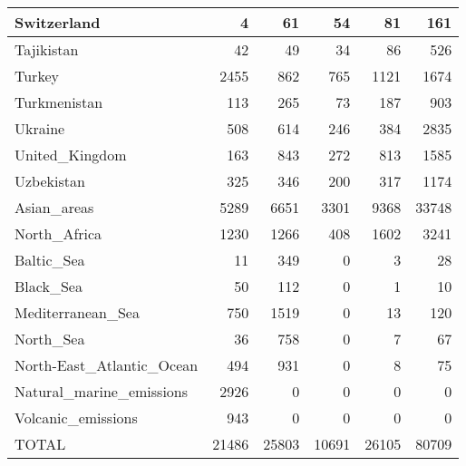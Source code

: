 \begin{table}
\begin{center}
\begin{tabular}{|l|r|r|r|r|r|}
                   Switzerland&     4&    61&    54&    81&   161 \\\hline
                    Tajikistan&    42&    49&    34&    86&   526 \\\hline
                        Turkey&  2455&   862&   765&  1121&  1674 \\\hline
                  Turkmenistan&   113&   265&    73&   187&   903 \\\hline
                       Ukraine&   508&   614&   246&   384&  2835 \\\hline
                United_Kingdom&   163&   843&   272&   813&  1585 \\\hline
                    Uzbekistan&   325&   346&   200&   317&  1174 \\\hline
                   Asian_areas&  5289&  6651&  3301&  9368& 33748 \\\hline
                  North_Africa&  1230&  1266&   408&  1602&  3241 \\\hline
                    Baltic_Sea&    11&   349&     0&     3&    28 \\\hline
                     Black_Sea&    50&   112&     0&     1&    10 \\\hline
             Mediterranean_Sea&   750&  1519&     0&    13&   120 \\\hline
                     North_Sea&    36&   758&     0&     7&    67 \\\hline
     North-East_Atlantic_Ocean&   494&   931&     0&     8&    75 \\\hline
      Natural_marine_emissions&  2926&     0&     0&     0&     0 \\\hline
            Volcanic_emissions&   943&     0&     0&     0&     0 \\\hline\hline
                         TOTAL& 21486& 25803& 10691& 26105& 80709 \\\hline

\end{tabular}
\end{center}
\end{table}


\clearpage
 
